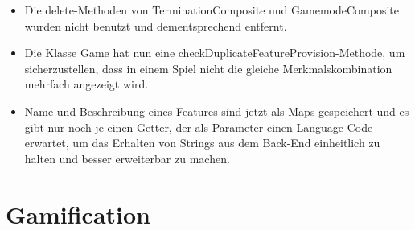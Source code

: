 \documentclass[a4paper]{scrreprt}
\begin{document}
\begin{itemize}
	\item Die delete-Methoden von TerminationComposite und GamemodeComposite wurden nicht benutzt und dementsprechend entfernt.
	\item Die Klasse Game hat nun eine checkDuplicateFeatureProvision-Methode, um sicherzustellen, dass in einem Spiel nicht die gleiche Merkmalskombination mehrfach angezeigt wird.
	\item Name und Beschreibung eines Features sind jetzt als Maps gespeichert und es gibt nur noch je einen Getter, der als Parameter einen Language Code erwartet, um das Erhalten von Strings aus dem Back-End einheitlich zu halten und besser erweiterbar zu machen.
\end{itemize}

\section{Gamification}
\end{document}

